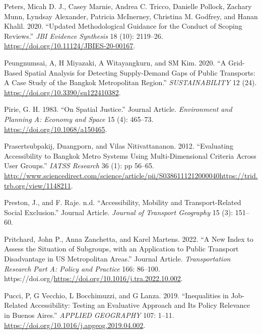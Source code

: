 \documentclass[12pt, oneside]{report}
\newlength{\cslhangindent}
\newlength{\cslentryspacingunit} %
\newenvironment{CSLReferences}[2] %
 {%
  \setlength{\parindent}{0pt}
  \ifodd #1
  \let\oldpar\par
  \def\par{\hangindent=\cslhangindent\oldpar}
  \fi
  \setlength{\parskip}{#2\cslentryspacingunit}
 }%
 {}
\begin{document}
\begin{CSLReferences}{1}{0}
\leavevmode{}%
Peters, Micah D. J., Casey Marnie, Andrea C. Tricco, Danielle Pollock,
Zachary Munn, Lyndsay Alexander, Patricia McInerney, Christina M.
Godfrey, and Hanan Khalil. 2020. {``Updated Methodological Guidance for
the Conduct of Scoping Reviews.''} \emph{JBI Evidence Synthesis} 18
(10): 2119--26. \url{https://doi.org/10.11124/JBIES-20-00167}.

\leavevmode{}%
Peungnumsai, A, H Miyazaki, A Witayangkurn, and SM Kim. 2020. {``A
{Grid-Based Spatial Analysis} for {Detecting Supply-Demand Gaps} of
{Public Transports}: {A Case Study} of the {Bangkok Metropolitan
Region}.''} \emph{SUSTAINABILITY} 12 (24).
\url{https://doi.org/10.3390/su122410382}.

\leavevmode{}%
Pirie, G. H. 1983. {``On Spatial Justice.''} Journal Article.
\emph{Environment and Planning A: Economy and Space} 15 (4): 465--73.
\url{https://doi.org/10.1068/a150465}.

\leavevmode{}%
Prasertsubpakij, Duangporn, and Vilas Nitivattananon. 2012.
{``Evaluating {Accessibility} to {Bangkok Metro Systems Using
Multi-Dimensional Criteria} Across {User Groups}.''} \emph{IATSS
Research} 36 (1): pp 56--65.
\url{http://www.sciencedirect.com/science/article/pii/S0386111212000040https://trid.trb.org/view/1148211}.

\leavevmode{}%
Preston, J., and F. Raje. n.d. {``Accessibility, Mobility and
Transport-Related Social Exclusion.''} Journal Article. \emph{Journal of
Transport Geography} 15 (3): 151--60.

\leavevmode{}%
Pritchard, John P., Anna Zanchetta, and Karel Martens. 2022. {``A New
Index to Assess the Situation of Subgroups, with an Application to
Public Transport Disadvantage in US Metropolitan Areas.''} Journal
Article. \emph{Transportation Research Part A: Policy and Practice} 166:
86--100.
https://doi.org/\url{https://doi.org/10.1016/j.tra.2022.10.002}.

\leavevmode{}%
Pucci, P, G Vecchio, L Bocchimuzzi, and G Lanza. 2019. {``Inequalities
in Job-Related Accessibility: {Testing} an Evaluative Approach and Its
Policy Relevance in {Buenos Aires}.''} \emph{APPLIED GEOGRAPHY} 107:
1--11. \url{https://doi.org/10.1016/j.apgeog.2019.04.002}.


\end{CSLReferences}
\end{document}
